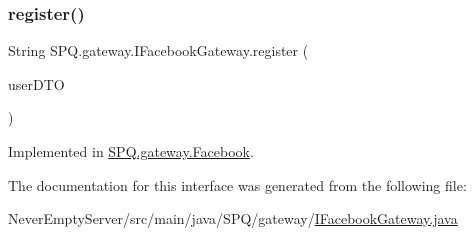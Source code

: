 \subsubsection{\texorpdfstring{register()}{register()}}
{\footnotesize\ttfamily String S\+P\+Q.\+gateway.\+I\+Facebook\+Gateway.\+register (\begin{DoxyParamCaption}\item[{\mbox{\hyperlink{class_s_p_q_1_1dto_1_1_user_d_t_o}{User\+D\+TO}}}]{user\+D\+TO }\end{DoxyParamCaption})}



Implemented in \mbox{\hyperlink{class_s_p_q_1_1gateway_1_1_facebook_aba03bc89c530d3f2159b3a1eb65c3427}{S\+P\+Q.\+gateway.\+Facebook}}.



The documentation for this interface was generated from the following file\+:\begin{DoxyCompactItemize}
\item 
Never\+Empty\+Server/src/main/java/\+S\+P\+Q/gateway/\mbox{\hyperlink{_i_facebook_gateway_8java}{I\+Facebook\+Gateway.\+java}}\end{DoxyCompactItemize}
